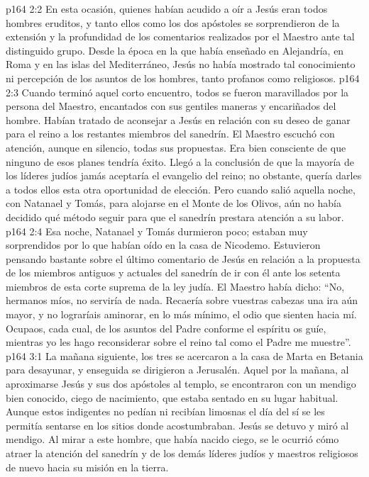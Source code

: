 \vs p164 2:2 En esta ocasión, quienes habían acudido a oír a Jesús eran todos hombres eruditos, y tanto ellos como los dos apóstoles se sorprendieron de la extensión y la profundidad de los comentarios realizados por el Maestro ante tal distinguido grupo. Desde la época en la que había enseñado en Alejandría, en Roma y en las islas del Mediterráneo, Jesús no había mostrado tal conocimiento ni percepción de los asuntos de los hombres, tanto profanos como religiosos.
\vs p164 2:3 Cuando terminó aquel corto encuentro, todos se fueron maravillados por la persona del Maestro, encantados con sus gentiles maneras y encariñados del hombre. Habían tratado de aconsejar a Jesús en relación con su deseo de ganar para el reino a los restantes miembros del sanedrín. El Maestro escuchó con atención, aunque en silencio, todas sus propuestas. Era bien consciente de que ninguno de esos planes tendría éxito. Llegó a la conclusión de que la mayoría de los líderes judíos jamás aceptaría el evangelio del reino; no obstante, quería darles a todos ellos esta otra oportunidad de elección. Pero cuando salió aquella noche, con Natanael y Tomás, para alojarse en el Monte de los Olivos, aún no había decidido qué método seguir para que el sanedrín prestara atención a su labor.
\vs p164 2:4 Esa noche, Natanael y Tomás durmieron poco; estaban muy sorprendidos por lo que habían oído en la casa de Nicodemo. Estuvieron pensando bastante sobre el último comentario de Jesús en relación a la propuesta de los miembros antiguos y actuales del sanedrín de ir con él ante los setenta miembros de esta corte suprema de la ley judía. El Maestro había dicho: “No, hermanos míos, no serviría de nada. Recaería sobre vuestras cabezas una ira aún mayor, y no lograríais aminorar, en lo más mínimo, el odio que sienten hacia mí. Ocupaos, cada cual, de los asuntos del Padre conforme el espíritu os guíe, mientras yo les hago reconsiderar sobre el reino tal como el Padre me muestre”.
\vs p164 3:1 La mañana siguiente, los tres se acercaron a la casa de Marta en Betania para desayunar, y enseguida se dirigieron a Jerusalén. Aquel  por la mañana, al aproximarse Jesús y sus dos apóstoles al templo, se encontraron con un mendigo bien conocido, ciego de nacimiento, que estaba sentado en su lugar habitual. Aunque estos indigentes no pedían ni recibían limosnas el día del  sí se les permitía sentarse en los sitios donde acostumbraban. Jesús se detuvo y miró al mendigo. Al mirar a este hombre, que había nacido ciego, se le ocurrió cómo atraer la atención del sanedrín y de los demás líderes judíos y maestros religiosos de nuevo hacia su misión en la tierra.
